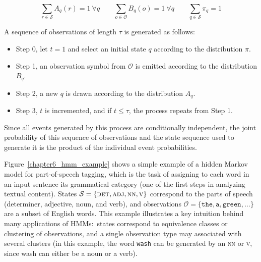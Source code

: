 \begin{equation}
\sum_{r \in \mathcal{S}} A_{q}(r) = 1\ \forall q  \quad \quad \sum_{o \in \mathcal{O}} B_{q}(o) = 1\ \forall q   \quad \quad \sum_{q \in \mathcal{S}} \pi_q = 1 
\end{equation}

\noindent A sequence of observations of length $\tau$ is generated as follows:

\begin{itemize}

\item[] Step 0, let $t=1$ and select an initial state $q$ according to the distribution $\pi$.  

\item[] Step 1, an observation symbol from $\mathcal{O}$ is emitted according to the distribution $B_q$. 

\item[] Step 2, a new $q$ is drawn according to the distribution $A_q$.  

\item[] Step 3, $t$ is incremented, and if $t \le \tau$, the process repeats from Step 1.

\end{itemize}

\noindent Since all events generated by this process are conditionally
independent, the joint probability of this sequence of observations
and the state sequence used to generate it is the product of the
individual event probabilities.

Figure~\ref{chapter6_hmm_example} shows a simple example of a hidden
Markov model for part-of-speech tagging, which is the task of
assigning to each word in an input sentence its grammatical category
(one of the first steps in analyzing textual content).  States
$\mathcal{S} = \{ \textsc{det}, \textsc{adj}, \textsc{nn}, \textsc{v}
\}$ correspond to the parts of speech (determiner, adjective, noun,
and verb), and observations $\mathcal{O} = \{ \texttt{the},
\texttt{a}, \texttt{green} , \ldots \}$ are a subset of English words.
This example illustrates a key intuition behind many applications of
HMMs:\ states correspond to equivalence classes or clustering of
observations, and a single observation type may associated with
several clusters (in this example, the word \texttt{wash} can be
generated by an \textsc{nn} or \textsc{v}, since wash can either be a
noun or a verb).

